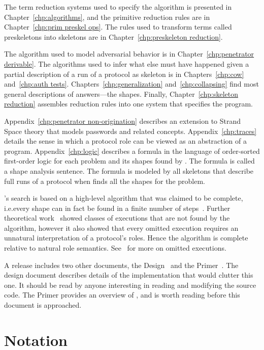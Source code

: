 \documentclass[12pt]{report}
\theoremstyle{definition}
\begin{document}
The term reduction systems used to specify the algorithm is presented
in Chapter~\ref{chp:algorithms}, and the primitive reduction rules are
in Chapter~\ref{chp:prim preskel ops}.  The rules used to transform
terms called preskeletons into skeletons are in
Chapter~\ref{chp:preskeleton reduction}.

The algorithm used to model adversarial behavior is in
Chapter~\ref{chp:penetrator derivable}.  The algorithms used to infer
what else must have happened given a partial description of a run of
a protocol as skeleton is in Chapters~\ref{chp:cow} and~\ref{chp:auth
  tests}.  Chapters~\ref{chp:generalization} and~\ref{chp:collapsing}
find most general descriptions of {\cpsa} answers---the shapes.
Finally, Chapter~\ref{chp:skeleton reduction} assembles reduction
rules into one system that specifies the {\cpsa} program.

Appendix~\ref{chp:penetrator non-origination} describes an extension
to Strand Space theory that models passwords and related concepts.
Appendix~\ref{chp:traces} details the sense in which a protocol role
can be viewed as an abstraction of a program.
Appendix~\ref{chp:logic} describes a formula in the language of
order-sorted first-order logic for each problem and its shapes found
by {\cpsa}.  The formula is called a shape analysis sentence.  The
formula is modeled by all skeletons that describe full runs of a
protocol when {\cpsa} finds all the shapes for the problem.

{\cpsa}'s search is based on a high-level algorithm that was claimed
to be complete, i.e.\@ every shape can in fact be found in a finite
number of steps~\cite{DoghmiGuttmanThayer07,Guttman11}.  Further
theoretical work~\cite{cpsatheory11} showed classes of executions that
are not found by the algorithm, however it also showed that every
omitted execution requires an unnatural interpretation of a protocol's
roles.  Hence the algorithm is complete relative to natural role
semantics.  See~\cite[Appendix~B]{cpsaprimer09} for more on omitted
executions.

A {\cpsa} release includes two other documents, the {\cpsa}
Design~\cite{cpsadesign09} and the {\cpsa} Primer~\cite{cpsaprimer09}.
The design document describes details of the {\cpsa}
implementation that would clutter this one.  It should be read by
anyone interesting in reading and modifying the source code.  The
{\cpsa} Primer provides an overview of {\cpsa}, and is worth
reading before this document is approached.

\section{Notation}\label{sec:notation}
\end{document}

